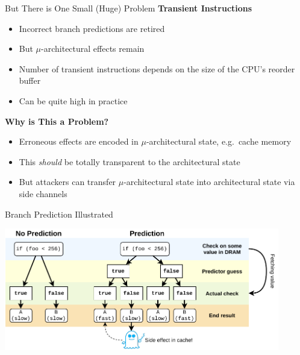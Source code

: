 \documentclass[10pt, dvipsnames, aspectratio=169]{beamer}
\begin{document}
\begin{frame}[c]{But There is One Small (Huge) Problem}{}
  {\bf Transient Instructions}
  \begin{itemize}
    \item Incorrect branch predictions are retired
    \item But $\mu$-architectural effects remain
    \item Number of transient instructions depends on the size of the CPU's reorder buffer
    \item Can be quite high in practice
  \end{itemize}

  \vfill
  {\bf Why is This a Problem?}
  \begin{itemize}
    \item Erroneous effects are encoded in $\mu$-architectural state, e.g.~cache memory
    \item This \textit{should} be totally transparent to the architectural state
    \item But attackers can transfer $\mu$-architectural state into architectural state via side channels
  \end{itemize}


\end{frame}

\begingroup
\setwatermark{}
\begin{frame}[c]{Branch Prediction Illustrated}
  \begin{center}
    \color{black}
    \includegraphics[width=0.9\textwidth]{figs/prediction.pdf}
  \end{center}
\end{frame}
\endgroup
\end{document}
